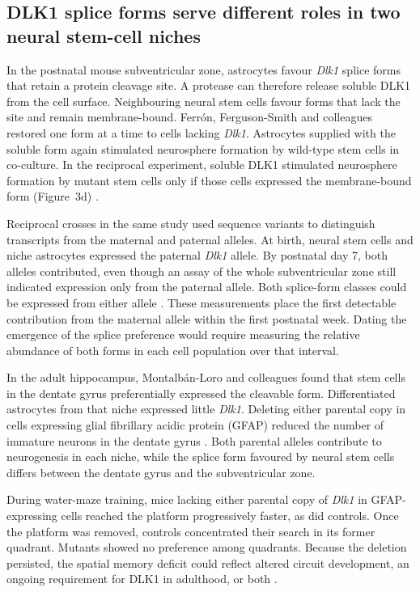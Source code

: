 \documentclass[11pt,a4paper]{article}
\begin{document}
\subsection{DLK1 splice forms serve different roles in two neural stem-cell niches}

In the postnatal mouse subventricular zone, astrocytes favour \textit{Dlk1} splice forms that retain a protein cleavage site. A protease can therefore release soluble DLK1 from the cell surface. Neighbouring neural stem cells favour forms that lack the site and remain membrane-bound. Ferrón, \mbox{Ferguson-Smith} and colleagues restored one form at a time to cells lacking \textit{Dlk1}. Astrocytes supplied with the soluble form again stimulated neurosphere formation by wild-type stem cells in co-culture. In the reciprocal experiment, soluble DLK1 stimulated neurosphere formation by mutant stem cells only if those cells expressed the membrane-bound form (Figure~3d) \cite{Ferron2011}.

Reciprocal crosses in the same study used sequence variants to distinguish transcripts from the maternal and paternal alleles. At birth, neural stem cells and niche astrocytes expressed the paternal \textit{Dlk1} allele. By postnatal day 7, both alleles contributed, even though an assay of the whole subventricular zone still indicated expression only from the paternal allele. Both splice-form classes could be expressed from either allele \cite{Ferron2011}. These measurements place the first detectable contribution from the maternal allele within the first postnatal week. Dating the emergence of the splice preference would require measuring the relative abundance of both forms in each cell population over that interval.

In the adult hippocampus, Montalbán-Loro and colleagues found that stem cells in the dentate gyrus preferentially expressed the cleavable form. Differentiated astrocytes from that niche expressed little \textit{Dlk1}. Deleting either parental copy in cells expressing glial fibrillary acidic protein (GFAP) reduced the number of immature neurons in the dentate gyrus \cite{Montalban2021}. Both parental alleles contribute to neurogenesis in each niche, while the splice form favoured by neural stem cells differs between the dentate gyrus and the subventricular zone.

During water-maze training, mice lacking either parental copy of \textit{Dlk1} in GFAP-expressing cells reached the platform progressively faster, as did controls. Once the platform was removed, controls concentrated their search in its former quadrant. Mutants showed no preference among quadrants. Because the deletion persisted, the spatial memory deficit could reflect altered circuit development, an ongoing requirement for DLK1 in adulthood, or both \cite{Montalban2021}.
\end{document}

